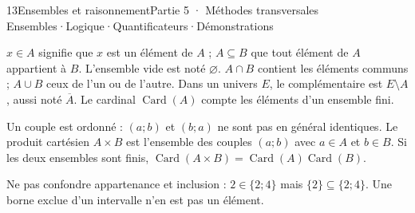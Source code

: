 \begin{ouverture}[ensembles]{13}{Ensembles et raisonnement}{Partie 5 · Méthodes transversales}
{Ensembles\enspace·\enspace Logique\enspace·\enspace Quantificateurs\enspace·\enspace Démonstrations}
\end{ouverture}
\essentiel
{}
\begin{definition}
$x\in A$ signifie que $x$ est un élément de $A$ ; $A\subseteq B$ que tout
élément de $A$ appartient à $B$. L'ensemble vide est noté $\varnothing$.
$A\cap B$ contient les éléments communs ; $A\cup B$ ceux de l'un ou de l'autre.
Dans un univers $E$, le complémentaire est $E\setminus A$, aussi noté $\overline A$.
Le cardinal $\operatorname{Card}(A)$ compte les éléments d'un ensemble fini.
\end{definition}
\begin{propriete}
Un couple est ordonné : $(a;b)$ et $(b;a)$ ne sont pas en général identiques.
Le produit cartésien $A\times B$ est l'ensemble des couples $(a;b)$ avec
$a\in A$ et $b\in B$. Si les deux ensembles sont finis,
$\operatorname{Card}(A\times B)=\operatorname{Card}(A)\operatorname{Card}(B)$.
\end{propriete}
\begin{center}
\par{}
\end{center}

\begin{attention}
Ne pas confondre appartenance et inclusion : $2\in\{2;4\}$ mais
$\{2\}\subseteq\{2;4\}$. Une borne exclue d'un intervalle n'en est pas un élément.
\end{attention}

